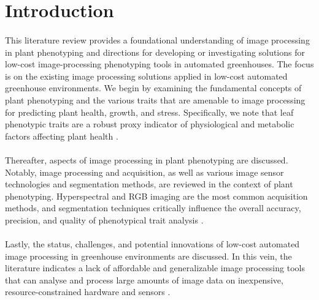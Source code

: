 \section{Introduction}

\paragraph{}
This literature review provides a foundational understanding of image processing in plant phenotyping and directions for developing or investigating solutions for low-cost image-processing phenotyping tools in automated greenhouses. The focus is on the existing image processing solutions applied in low-cost automated greenhouse environments. We begin by examining the fundamental concepts of plant phenotyping and the various traits that are amenable to image processing for predicting plant health, growth, and stress. Specifically, we note that leaf phenotypic traits are a robust proxy indicator of physiological and metabolic factors affecting plant health \cite{zhangHighthroughputPhenotypingPlant2023}.

\paragraph{}
Thereafter, aspects of image processing in plant phenotyping are discussed. Notably, image processing and acquisition, as well as various image sensor technologies and segmentation methods, are reviewed in the context of plant phenotyping. Hyperspectral and RGB imaging are the most common acquisition methods, and segmentation techniques critically influence the overall accuracy, precision, and quality of phenotypical trait analysis \cite{choudhurySegmentationTechniquesChallenges2020, muller-linowPlantScreenMobile2019}.

\paragraph{}
Lastly, the status, challenges, and potential innovations of low-cost automated image processing in greenhouse environments are discussed. In this vein, the literature indicates a lack of affordable and generalizable image processing tools that can analyse and process large amounts of image data on inexpensive, resource-constrained hardware and sensors \cite{gomesComputationalSustainabilityComputational2009, minerviniImageAnalysisNew2015}.